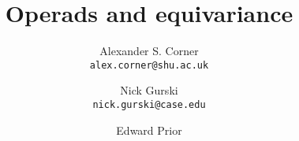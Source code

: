 \documentclass{article} %
\title{Operads and equivariance}
\author{
  Alexander S. Corner\\
  \texttt{alex.corner@shu.ac.uk}
  \and
  Nick Gurski\\
  \texttt{nick.gurski@case.edu}
  \and
  Edward Prior
}
\date{}
\theoremstyle{example}
\begin{document}
\maketitle


\abstract



















% 

% 

% 

% 





% 
%   

\printbibliography
\end{document}
